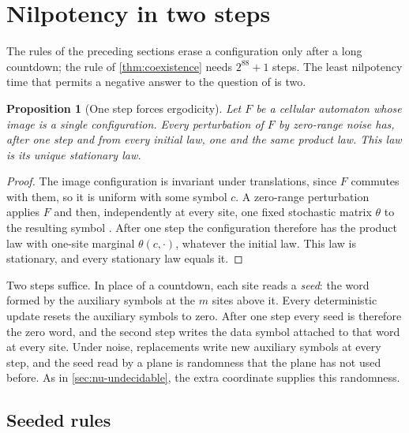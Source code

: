\documentclass[11pt]{article}
\theoremstyle{plain}
\newtheorem{proposition}[theorem]{Proposition}
\theoremstyle{definition}
\theoremstyle{remark}
\begin{document}
\section{Nilpotency in two steps}\label{sec:two-step}

The rules of the preceding sections erase a configuration only after a long countdown; the rule of \cref{thm:coexistence} needs $2^{88}+1$ steps. The least nilpotency time that permits a negative answer to the question of \cite{MST19} is two.

\begin{proposition}[One step forces ergodicity]\label{prop:one-step}
Let $F$ be a cellular automaton whose image is a single configuration. Every perturbation of $F$ by zero-range noise has, after one step and from every initial law, one and the same product law. This law is its unique stationary law.
\end{proposition}
\begin{proof}
The image configuration is invariant under translations, since $F$ commutes with them, so it is uniform with some symbol $c$. A zero-range perturbation applies $F$ and then, independently at every site, one fixed stochastic matrix $\theta$ to the resulting symbol \cite{MST19}. After one step the configuration therefore has the product law with one-site marginal $\theta(c,\cdot)$, whatever the initial law. This law is stationary, and every stationary law equals it.
\end{proof}

Two steps suffice. In place of a countdown, each site reads a \emph{seed}: the word formed by the auxiliary symbols at the $m$ sites above it. Every deterministic update resets the auxiliary symbols to zero. After one step every seed is therefore the zero word, and the second step writes the data symbol attached to that word at every site. Under noise, replacements write new auxiliary symbols at every step, and the seed read by a plane is randomness that the plane has not used before. As in \cref{sec:nu-undecidable}, the extra coordinate supplies this randomness.

\subsection{Seeded rules}
\end{document}
